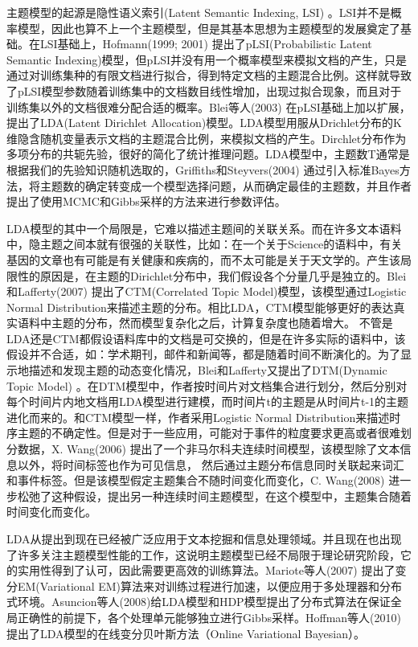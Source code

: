 主题模型的起源是隐性语义索引(Latent Semantic Indexing, LSI) \cite{deerwester1990indexing}。LSI并不是概率模型，因此也算不上一个主题模型，但是其基本思想为主题模型的发展奠定了基础。在LSI基础上，Hofmann(1999; 2001) \cite{hofmann1999probabilistic, hofmann2001unsupervised} 提出了pLSI(Probabilistic Latent Semantic Indexing)模型，但pLSI并没有用一个概率模型来模拟文档的产生，只是通过对训练集种的有限文档进行拟合，得到特定文档的主题混合比例。这样就导致了pLSI模型参数随着训练集中的文档数目线性增加，出现过拟合现象，而且对于训练集以外的文档很难分配合适的概率。Blei等人(2003) \cite{Blei:2003} 在pLSI基础上加以扩展，提出了LDA(Latent Dirichlet Allocation)模型。LDA模型用服从Drichlet分布的K维隐含随机变量表示文档的主题混合比例，来模拟文档的产生。Dirchlet分布作为多项分布的共轭先验，很好的简化了统计推理问题。LDA模型中，主题数T通常是根据我们的先验知识随机选取的，Griffiths和Steyvers(2004) \cite{griffiths2004finding} 通过引入标准Bayes方法，将主题数的确定转变成一个模型选择问题，从而确定最佳的主题数，并且作者提出了使用MCMC和Gibbs采样的方法来进行参数评估。

LDA模型的其中一个局限是，它难以描述主题间的关联关系。而在许多文本语料中，隐主题之间本就有很强的关联性，比如：在一个关于Science的语料中，有关基因的文章也有可能是有关健康和疾病的，而不太可能是关于天文学的。产生该局限性的原因是，在主题的Dirichlet分布中，我们假设各个分量几乎是独立的。Blei和Lafferty(2007) \cite{lafferty2005correlated} 提出了CTM(Correlated Topic Model)模型，该模型通过Logistic Normal Distribution来描述主题的分布。相比LDA，CTM模型能够更好的表达真实语料中主题的分布，然而模型复杂化之后，计算复杂度也随着增大。
不管是LDA还是CTM都假设语料库中的文档是可交换的，但是在许多实际的语料中，该假设并不合适，如：学术期刊，邮件和新闻等，都是随着时间不断演化的。为了显示地描述和发现主题的动态变化情况，Blei和Lafferty又提出了DTM(Dynamic Topic Model) \cite{Blei:2006} 。在DTM模型中，作者按时间片对文档集合进行划分，然后分别对每个时间片内地文档用LDA模型进行建模，而时间片t的主题是从时间片t-1的主题进化而来的。和CTM模型一样，作者采用Logistic Normal Distribution来描述时序主题的不确定性。但是对于一些应用，可能对于事件的粒度要求更高或者很难划分数据，X. Wang(2006) \cite{wang2006topics} 提出了一个非马尔科夫连续时间模型，该模型除了文本信息以外，将时间标签也作为可见信息，
然后通过主题分布信息同时关联起来词汇和事件标签。但是该模型假定主题集合不随时间变化而变化，C. Wang(2008) \cite{wang2008continuous} 进一步松弛了这种假设，提出另一种连续时间主题模型，在这个模型中，主题集合随着时间变化而变化。

LDA从提出到现在已经被广泛应用于文本挖掘和信息处理领域。并且现在也出现了许多关注主题模型性能的工作，这说明主题模型已经不局限于理论研究阶段，它的实用性得到了认可，因此需要更高效的训练算法。Mariote等人(2007)\cite{mariote2007parallelized} 提出了变分EM(Variational EM)算法来对训练过程进行加速，以便应用于多处理器和分布式环境。Asuncion等人(2008)给LDA模型和HDP模型提出了分布式算法在保证全局正确性的前提下，各个处理单元能够独立进行Gibbs采样。Hoffman等人(2010) \cite{hoffman2010online} 提出了LDA模型的在线变分贝叶斯方法（Online Variational Bayesian）。


